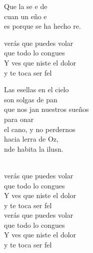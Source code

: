 \begin{cancion}
	Que la  se e de  \\
	cuan un eño e\\
	es porque se ha hecho re.\jump\\
	\begin{chorus}%
		verás que puedes volar\\
		que todo lo congues\\
		Y ves que niste el dolor\\
		y te toca ser fel \jump\\
	\end{chorus}%
	Las esellas en el cielo\\
	son solgas de pan\\
	que nos jan nuestros sueños\\
	para onar\\
	el cano, y no perdernos\\
	hacia lerra de Oz,\\
	nde habita la ilusn.\\
	\jumjump\\
	\begin{chorus}%
		verás que puedes volar\\
		que todo lo congues\\
		Y ves que niste el dolor\\
		y te toca ser fel\chord{Mi}{}{iz} \\
	\jump
		verás que puedes volar\\
		que todo lo congues\\
		Y ves que niste el dolor\\
		y te toca ser fel \jump\\
	\end{chorus}%
\end{cancion}%

